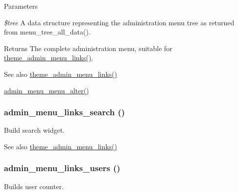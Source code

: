 \begin{DoxyParams}{Parameters}
\item[{\em \$tree}]A data structure representing the administration menu tree as returned from menu\_\-tree\_\-all\_\-data().\end{DoxyParams}
\begin{DoxyReturn}{Returns}
The complete administration menu, suitable for \hyperlink{admin__menu_8module_a33d1120bbd0ebf32f21f44c17b831475}{theme\_\-admin\_\-menu\_\-links()}.
\end{DoxyReturn}
\begin{DoxySeeAlso}{See also}
\hyperlink{admin__menu_8module_a33d1120bbd0ebf32f21f44c17b831475}{theme\_\-admin\_\-menu\_\-links()} 

\hyperlink{admin__menu_8module_a5215739b9f88a38d14ba99f5413b904e}{admin\_\-menu\_\-menu\_\-alter()} 
\end{DoxySeeAlso}
\hypertarget{admin__menu_8inc_a9c16c388d608eb3e3f7106e61080203d}{
\subsubsection[{admin\_\-menu\_\-links\_\-search}]{\setlength{\rightskip}{0pt plus 5cm}admin\_\-menu\_\-links\_\-search ()}}
\label{admin__menu_8inc_a9c16c388d608eb3e3f7106e61080203d}
Build search widget.

\begin{DoxySeeAlso}{See also}
\hyperlink{admin__menu_8module_a33d1120bbd0ebf32f21f44c17b831475}{theme\_\-admin\_\-menu\_\-links()} 
\end{DoxySeeAlso}
\hypertarget{admin__menu_8inc_aa054287a0a1394edc680d591f3ee1ae4}{
\subsubsection[{admin\_\-menu\_\-links\_\-users}]{\setlength{\rightskip}{0pt plus 5cm}admin\_\-menu\_\-links\_\-users ()}}
\label{admin__menu_8inc_aa054287a0a1394edc680d591f3ee1ae4}
Builds user counter.

